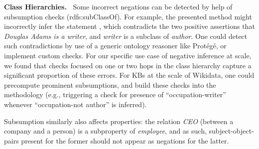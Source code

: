 \noindent
\textbf{Class Hierarchies.\ }
Some incorrect negations can be detected by help of subsumption checks (rdfs:subClassOf). For example, the presented method might incorrectly infer the statement , which contradicts the two positive assertions that \textit{Douglas Adams is a writer}, and \textit{writer} is a subclass of \textit{author}. One could detect such contradictions by use of a generic ontology reasoner like Protégé, or implement custom checks. For our specific use case of negative inference at scale, we found that checks focused on one or two hops in the class hierarchy capture a significant proportion of these errors. For KBs at the scale of Wikidata, one could precompute prominent subsumptions, and build these checks into the methodology (e.g., triggering a check for presence of ``occupation-writer'' whenever ``occupation-not author'' is inferred).

Subsumption similarly also affects properties: the relation \textit{CEO} (between a company and a person) is a subproperty of \textit{employee}, and as such, subject-object-pairs present for the former should not appear as negations for the latter.





